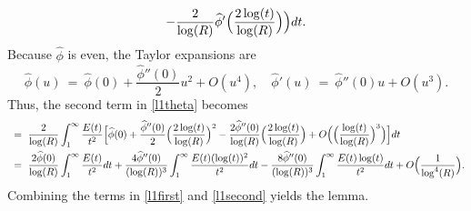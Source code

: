 \documentclass[11pt, reqno]{amsart}
\makeatletter
\renewenvironment{proof}[1][\proofname]{\par
  \vspace{-.7\topsep}%
  \pushQED{\qed}%
  \normalfont
  \topsep0pt \partopsep0pt %
  \trivlist
  \item[\hskip\labelsep
        \itshape
    #1\@addpunct{.}]\ignorespaces
}{%
  \popQED\endtrivlist\@endpefalse
  \addvspace{6pt plus 6pt} %
}
\theoremstyle{definition}
\theoremstyle{remark}
\numberwithin{equation}{section}
\renewcommand{\hat}{\widehat}
\makeatother
\begin{document}
\begin{proof}
\begin{equation}
-\frac{2}{\log(R)}\hat\phi'\Bigl(\frac{2\log(t)}{\log(R)}\Bigr)\Bigr)dt.
\end{equation}
Because $\hat\phi$ is even, the Taylor expansions are
\begin{equation}
\hat\phi(u) \ = \ \hat\phi(0)+\frac{\hat\phi''(0)}{2}u^{2}+O(u^{4}), \quad
\hat\phi'(u) \ = \ \hat\phi''(0)u+O(u^3).
\end{equation}
Thus, the second term in \eqref{l1theta} becomes
\begin{equation}
\begin{aligned}
& \ = \ \frac{2}{\log(R)}\int_{1}^{\infty}\frac{E(t)}{t^{2}}
\Bigl[\hat\phi(0)
      +\frac{\hat\phi''(0)}{2}\Bigl(\frac{2\log(t)}{\log(R)}\Bigr)^{2}
      -\frac{2\hat\phi''(0)}{\log(R)}\Bigl(\frac{2\log(t)}{\log(R)}\Bigr)
      +O\Bigl(\Bigl(\frac{\log(t)}{\log(R)}\Bigr)^{3}\Bigr)
\Bigr]dt \\
& \ = \  \frac{2\hat\phi(0)}{\log(R)}\int_{1}^{\infty}\frac{E(t)}{t^{2}}dt
+\frac{4\hat\phi''(0)}{(\log(R))^{3}}\int_{1}^{\infty}\frac{E(t)(\log(t))^{2}}{t^{2}}dt
-\frac{8\hat\phi''(0)}{(\log(R))^{3}}\int_{1}^{\infty}\frac{E(t)\log(t)}{t^{2}}dt
+O\Bigl(\frac{1}{\log^4(R)}\Bigr). \label{l1second}
\end{aligned}
\end{equation}
Combining the terms in \eqref{l1first} and \eqref{l1second} yields the lemma.
\end{proof}
\end{document}
